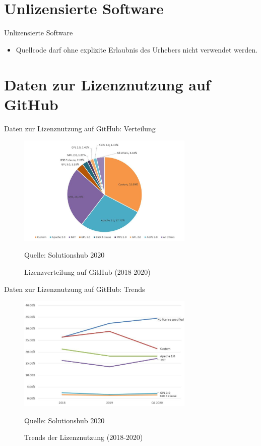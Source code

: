\documentclass{beamer}
\begin{document}
\section{Unlizensierte Software}
\begin{frame}{Unlizensierte Software}
	\begin{itemize}
		\item Quellcode darf ohne explizite Erlaubnis des Urhebers nicht verwendet werden.
	\end{itemize}
\end{frame}

\section{Daten zur Lizenznutzung auf GitHub}
\begin{frame}{Daten zur Lizenznutzung auf GitHub: Verteilung}
	\begin{figure}[ht]
		\includegraphics[width=0.75\textwidth]{lizenzverteilung}
		\centering
		\caption{Lizenzverteilung auf GitHub (2018-2020)}
		Quelle: Solutionshub 2020
	\end{figure}
\end{frame}

\begin{frame}{Daten zur Lizenznutzung auf GitHub: Trends}
	\begin{figure}[ht]
		\includegraphics[width=0.75\textwidth]{trend}
		\centering
		\caption{Trends der Lizenznutzung (2018-2020)}
		Quelle: Solutionshub 2020
	\end{figure}
\end{frame}
\end{document}
